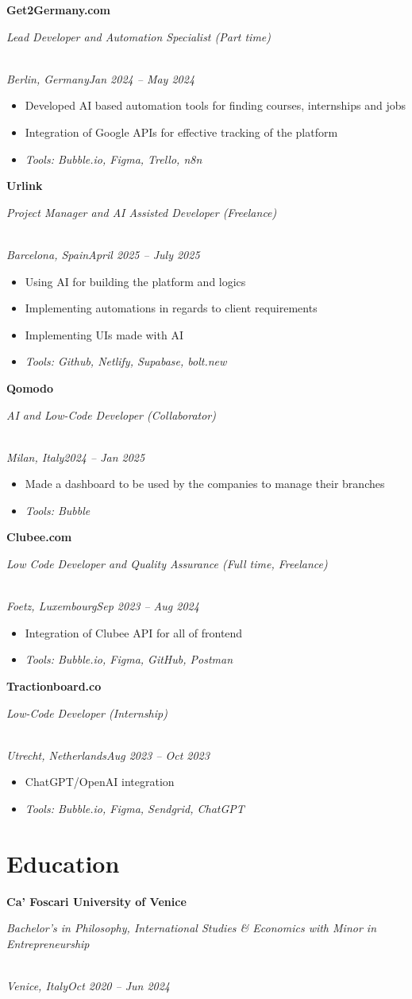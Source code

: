 \documentclass[a4paper,10pt]{article}
\newcommand{\role}[4]{\vspace{3pt}\noindent\hspace{0.6em}\parbox[t]{0.38\textwidth}{\raggedright\textbf{#1}}\hfill\parbox[t]{0.58\textwidth}{\raggedleft\textit{#2}}\\{\textit{#3}\hfill\textit{#4}}\vspace{1pt}}
\begin{document}
\role{Get2Germany.com}{Lead Developer and Automation Specialist (Part time)}{Berlin, Germany}{Jan 2024 -- May 2024}
\begin{itemize}
\item Developed AI based automation tools for finding courses, internships and jobs
\item Integration of Google APIs for effective tracking of the platform
\item \textit{Tools: Bubble.io, Figma, Trello, n8n}
\end{itemize}

\role{Urlink}{Project Manager and AI Assisted Developer (Freelance)}{Barcelona, Spain}{April 2025 -- July 2025}
\begin{itemize}
\item Using AI for building the platform and logics
\item Implementing automations in regards to client requirements
\item Implementing UIs made with AI
\item \textit{Tools: Github, Netlify, Supabase, bolt.new}
\end{itemize}

\role{Qomodo}{AI and Low-Code Developer (Collaborator)}{Milan, Italy}{2024 -- Jan 2025}
\begin{itemize}
\item Made a dashboard to be used by the companies to manage their branches
\item \textit{Tools: Bubble}
\end{itemize}

\role{Clubee.com}{Low Code Developer and Quality Assurance (Full time, Freelance)}{Foetz, Luxembourg}{Sep 2023 -- Aug 2024}
\begin{itemize}
\item Integration of Clubee API for all of frontend
\item \textit{Tools: Bubble.io, Figma, GitHub, Postman}
\end{itemize}

\role{Tractionboard.co}{Low-Code Developer (Internship)}{Utrecht, Netherlands}{Aug 2023 -- Oct 2023}
\begin{itemize}
\item ChatGPT/OpenAI integration
\item \textit{Tools: Bubble.io, Figma, Sendgrid, ChatGPT}
\end{itemize}

\section{Education}
\role{Ca' Foscari University of Venice}{Bachelor's in Philosophy, International Studies \& Economics with Minor in Entrepreneurship}{Venice, Italy}{Oct 2020 -- Jun 2024}
\end{document}
